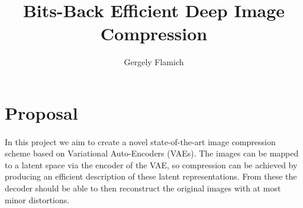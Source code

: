 \documentclass{article}
\title{Bits-Back Efficient Deep Image Compression}
\author{Gergely Flamich}
\begin{document}
\maketitle
\section*{Proposal}
\paragraph{}
In this project we aim to create a novel state-of-the-art image compression scheme
based on Variational Auto-Encoders \cite{kingma2013auto} (VAEs). 
The images can be mapped to a latent space via the encoder of the VAE, so
compression can be achieved by producing an efficient description of these latent
representations. From these the decoder should be able to then
reconstruct the original images with at most minor distortions.
\end{document}

